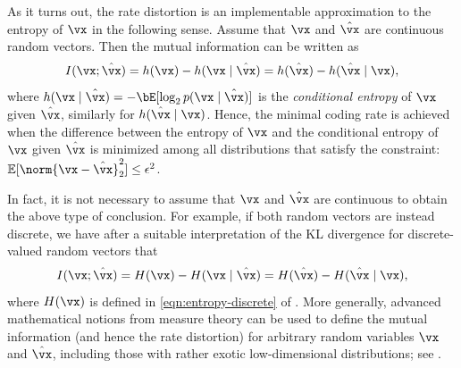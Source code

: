 \documentclass[../../book-main.tex]{subfiles}
\begin{document}
\begin{remark}
    As it turns out, the rate distortion is an implementable
    approximation to the entropy of $\vx$ in the following sense.
    Assume that $\vx$ and $\hat{\vx}$ are continuous random vectors.
    Then the mutual information can be written as
    \begin{equation}\label{eq:information-entropy}
        I(\vx; \hat\vx) = h(\vx) - h(\vx \mid \hat \vx) = h(\hat \vx) - h(\hat \vx \mid \vx),
    \end{equation}
    where $h(\vx \mid \hat \vx) = -\bE[\log_2 p(\vx \mid \hat\vx)]$ is the
    \textit{conditional entropy} of $\vx$ given $\hat \vx$, similarly for $h(\hat \vx \mid \vx)$.
    Hence, the minimal coding rate is achieved when the difference between the
    entropy of $\vx$ and the conditional entropy of $\vx$ given $\hat \vx$
    is minimized among all distributions that satisfy
    the constraint: $\mathbb{E} [\norm{\vx- \hat \vx}_2^2] \le \epsilon^2$.

    In fact, it is not necessary to assume that $\vx$ and $\hat \vx$
    are continuous
    to obtain the above type of conclusion. For example, if both random vectors
    are instead discrete, we have after a suitable interpretation of the KL
    divergence for discrete-valued random vectors that
    \begin{equation}\label{eq:mutual}
        I(\vx; \hat\vx) = H(\vx) - H(\vx \mid \hat \vx) = H(\hat \vx) - H(\hat \vx \mid \vx),
    \end{equation}
    where $H(\vx)$ is defined in \eqref{eqn:entropy-discrete} of
    .
    More generally, advanced mathematical notions from measure theory can be
    used to define the mutual information (and hence the rate distortion) for
    arbitrary random variables $\vx$ and $\hat \vx$, including those with rather
    exotic low-dimensional distributions; see \textcite[\S 8.5]{Cover-Thomas}.
\end{remark}
\end{document}
